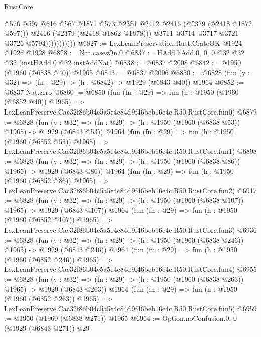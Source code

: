 \begin{lexlean}{RustCore}
\begin{coremodule}
                              @576
                              @597
                              @616
                              @567
                              @1871
                              @573
                              @2351
                              @2412
                              @2416
                              (@2379 (@2418 @1872 @597)))
                            @2416
                            (@2379 (@2418 @1862 @1878)))
                          @3711
                          @3714
                          @3717
                          @3721
                          @3726
                          @5794)))))))))))
@6827 := LexLeanPreservation.Rust.CrateOK @1924 @1926 @1928
@6828 := Nat.casesOn.{0}
@6837 := HAdd.hAdd.{0, 0, 0} @32 @32 @32 (instHAdd.{0} @32 instAddNat)
@6838 := @6837 @2008
@6842 := @1950 (@1960 (@6838 @40)) @1965
@6843 := @6837 @2006
@6850 := @6828 (fun (y : @32) => (fn : @29) -> (h : @6842) -> @1929 (@6843 @40)) @1964
@6852 := @6837 Nat.zero
@6860 := @6850
    (fun (fn : @29) =>
    fun (h : @1950 (@1960 (@6852 @40)) @1965) =>
    LexLeanPreserve.Cac32f86b04c5a5e4c84d9f46beb16e4c.R50.RustCore.fun0)
@6879 := @6828
    (fun (y : @32) => (fn : @29) -> (h : @1950 (@1960 (@6838 @53)) @1965) -> @1929 (@6843 @53))
    @1964
    (fun (fn : @29) =>
    fun (h : @1950 (@1960 (@6852 @53)) @1965) =>
    LexLeanPreserve.Cac32f86b04c5a5e4c84d9f46beb16e4c.R50.RustCore.fun1)
@6898 := @6828
    (fun (y : @32) => (fn : @29) -> (h : @1950 (@1960 (@6838 @86)) @1965) -> @1929 (@6843 @86))
    @1964
    (fun (fn : @29) =>
    fun (h : @1950 (@1960 (@6852 @86)) @1965) =>
    LexLeanPreserve.Cac32f86b04c5a5e4c84d9f46beb16e4c.R50.RustCore.fun2)
@6917 := @6828
    (fun (y : @32) => (fn : @29) -> (h : @1950 (@1960 (@6838 @107)) @1965) -> @1929 (@6843 @107))
    @1964
    (fun (fn : @29) =>
    fun (h : @1950 (@1960 (@6852 @107)) @1965) =>
    LexLeanPreserve.Cac32f86b04c5a5e4c84d9f46beb16e4c.R50.RustCore.fun3)
@6936 := @6828
    (fun (y : @32) => (fn : @29) -> (h : @1950 (@1960 (@6838 @246)) @1965) -> @1929 (@6843 @246))
    @1964
    (fun (fn : @29) =>
    fun (h : @1950 (@1960 (@6852 @246)) @1965) =>
    LexLeanPreserve.Cac32f86b04c5a5e4c84d9f46beb16e4c.R50.RustCore.fun4)
@6955 := @6828
    (fun (y : @32) => (fn : @29) -> (h : @1950 (@1960 (@6838 @263)) @1965) -> @1929 (@6843 @263))
    @1964
    (fun (fn : @29) =>
    fun (h : @1950 (@1960 (@6852 @263)) @1965) =>
    LexLeanPreserve.Cac32f86b04c5a5e4c84d9f46beb16e4c.R50.RustCore.fun5)
@6959 := @1950 (@1960 (@6838 @271)) @1965
@6964 := Option.noConfusion.{0, 0} (@1929 (@6843 @271)) @29

\end{coremodule}
\end{lexlean}
